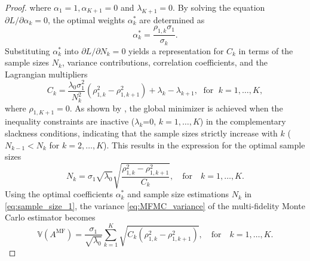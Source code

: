 \begin{proof}
%
where $\alpha_1 = 1, \alpha_{K+1} = 0$ and $\lambda_{K+1} = 0$. By solving the equation $\partial L/\partial \alpha_k=0$, the optimal weights $\alpha_k^*$ are determined as
%
\[
\alpha_k^*=\frac{\rho_{1,k}\sigma_1}{\sigma_k}.
\]
%
Substituting $\alpha_k^*$ into $\partial L/\partial N_k=0$ yields a representation for $C_k$ in terms of the sample sizes $N_k$, variance contributions, correlation coefficients, and the Lagrangian multipliers
\begin{equation*}
    C_k=\frac{\lambda_0\sigma_1^2}{N_k^2}\left(\rho_{1,k}^2-\rho_{1,k+1}^2\right)+\lambda_k-\lambda_{k+1}, \;\text{ for }\; k=1,\ldots,K, 
\end{equation*}
where $\rho_{1,K+1} = 0$. As shown by  \cite{PeWiGu:2016}, the global minimizer is achieved when the inequality constraints are inactive ($\lambda_k$=0, $k=1,\dots, K$) in the complementary slackness conditions, indicating that the sample sizes strictly increase with $k$ ($N_{k-1}< N_k$ for $k=2,\ldots, K$). This results in the expression for the optimal sample sizes
\begin{equation}
\label{eq:sample_size_1}
    N_k = \sigma_1\sqrt{\lambda_0}\sqrt{\frac{\rho_{1,k}^2-\rho_{1,k+1}^2}{C_k}},\quad \text{for}\quad  k=1,\ldots,K.
\end{equation}
Using the optimal coefficients $\alpha_k^*$ and sample size estimations $N_k$ in \eqref{eq:sample_size_1}, the variance \eqref{eq:MFMC_variance} of the multi-fidelity Monte Carlo estimator becomes
%
\begin{equation*} \label{eq:MFMC_variance2}
    \mathbb{V}\left(A^{\text{MF}}\right) = \frac{\sigma_1}{\sqrt{\lambda_0}}\sum_{k=1}^K\sqrt{C_k\left(\rho_{1,k}^2-\rho_{1,k+1}^2\right)}, \quad \text{for}\quad  k=1,\ldots,K.

\end{equation*}
\end{proof}
